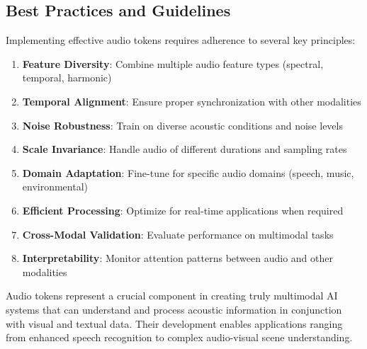 \subsection{Best Practices and Guidelines}

Implementing effective audio tokens requires adherence to several key principles:

\begin{enumerate}
\item \textbf{Feature Diversity}: Combine multiple audio feature types (spectral, temporal, harmonic)
\item \textbf{Temporal Alignment}: Ensure proper synchronization with other modalities
\item \textbf{Noise Robustness}: Train on diverse acoustic conditions and noise levels
\item \textbf{Scale Invariance}: Handle audio of different durations and sampling rates
\item \textbf{Domain Adaptation}: Fine-tune for specific audio domains (speech, music, environmental)
\item \textbf{Efficient Processing}: Optimize for real-time applications when required
\item \textbf{Cross-Modal Validation}: Evaluate performance on multimodal tasks
\item \textbf{Interpretability}: Monitor attention patterns between audio and other modalities
\end{enumerate}

Audio tokens represent a crucial component in creating truly multimodal AI systems that can understand and process acoustic information in conjunction with visual and textual data. Their development enables applications ranging from enhanced speech recognition to complex audio-visual scene understanding.

